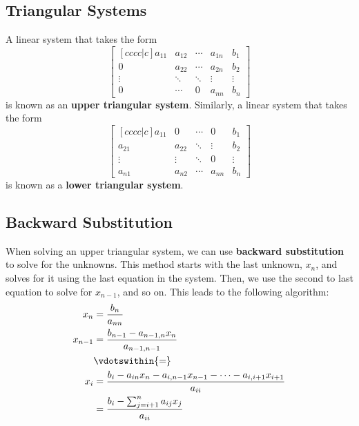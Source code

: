 \documentclass{article}
\begin{document}
\subsection{Triangular Systems}
A linear system that takes the form
\begin{equation*}
    \begin{bmatrix}[cccc|c]
        a_{11} & a_{12} & \cdots & a_{1n} & b_1    \\
        0      & a_{22} & \cdots & a_{2n} & b_2    \\
        \vdots & \ddots & \ddots & \vdots & \vdots \\
        0      & \cdots & 0      & a_{nn} & b_n
    \end{bmatrix}
\end{equation*}
is known as an \textbf{upper triangular system}. Similarly, a linear system that takes the form
\begin{equation*}
    \begin{bmatrix}[cccc|c]
        a_{11} & 0      & \cdots & 0      & b_1    \\
        a_{21} & a_{22} & \ddots & \vdots & b_2    \\
        \vdots & \vdots & \ddots & 0      & \vdots \\
        a_{n1} & a_{n2} & \cdots & a_{nn} & b_n
    \end{bmatrix}
\end{equation*}
is known as a \textbf{lower triangular system}.
\subsection{Backward Substitution}
When solving an upper triangular system, we can use \textbf{backward substitution} to solve for the unknowns.
This method starts with the last unknown, \(x_n\), and solves for it using the last equation in the system.
Then, we use the second to last equation to solve for \(x_{n - 1}\), and so on.
This leads to the following algorithm:
\begin{align*}
    x_n       & = \frac{b_n}{a_{nn}}                                                                         \\
    x_{n - 1} & = \frac{b_{n - 1} - a_{n - 1, n} x_n}{a_{n - 1, n - 1}}                                      \\
              & \vdotswithin{=}                                                                              \\
    x_i       & = \frac{b_i - a_{in} x_n - a_{i, n - 1} x_{n - 1} - \cdots - a_{i, i + 1} x_{i + 1}}{a_{ii}} \\
              & = \frac{b_i - \sum_{j = i + 1}^n a_{ij} x_j}{a_{ii}}                                         \\
\end{align*}
\end{document}

